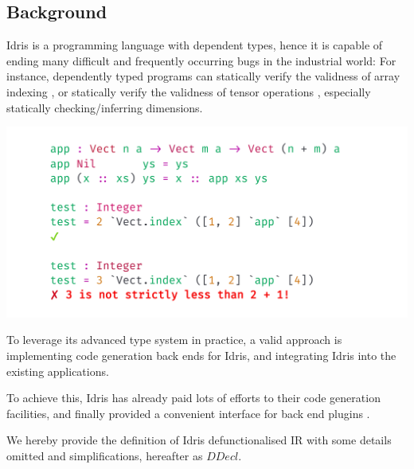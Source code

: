 \documentclass[a1,portrait]{a1poster}
\begin{document}
\begin{multicols}{2}

\section*{Background}

Idris is a programming language with dependent types,
hence it is capable of ending many difficult and frequently occurring bugs in the industrial world:
For instance, dependently typed programs can statically verify the validness of array indexing \cite {xi1998eliminating},
or statically verify the validness of tensor operations \cite {eaton2006statically} \cite {chen2017typesafe},
especially statically checking/inferring dimensions.

\begin{minipage}[b]{1\linewidth}
\begin{center}
\includegraphics[width=0.8\linewidth]{figs/canonical.png}
\vspace{-1cm}
\end{center}

\end{minipage}

\vspace{0.5cm}

To leverage its advanced type system in practice, a valid approach is
implementing code generation back ends for Idris, and integrating Idris into
the existing applications.

To achieve this, Idris has already paid lots of efforts to their code generation facilities,
and finally provided a convenient interface for back end plugins \cite{brady2015cross}.

We hereby provide the definition of Idris defunctionalised IR with some details omitted and simplifications,
hereafter as $DDecl$.


\end{multicols}
\end{document}
